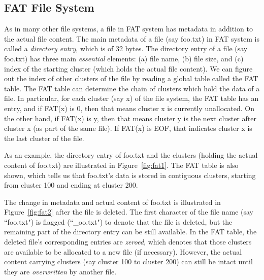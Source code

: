 \subsection{FAT File System}
\begin{paraphrase}
 As in many other file systems, a file in FAT system has metadata in addition to the actual file content. 
The main metadata of a file (say foo.txt) in FAT system is called a \emph{directory entry}, which is of 32 bytes.
The directory entry of a file (say foo.txt) has three main \emph{essential} elements: (a) file name, (b) file size, and 
(c) index of the starting cluster (which holds the actual file content). We can figure 
out the index of other clusters of the file by reading a global table called the FAT table. The FAT table
can determine the chain of clusters which hold the data of a file. In particular, 
for each cluster (say x) of the file system, the FAT table has an entry, and 
if FAT(x) is 0, then that means cluster x is currently unallocated. 
On the other hand, if FAT(x) is y, then that means cluster y is the next cluster after cluster x (as part of the same file).
If FAT(x) is EOF, that indicates cluster x is the last cluster of the file.
   
As an example, the directory entry of foo.txt and the clusters (holding the actual content of foo.txt) 
are illustrated in Figure~\ref{fig:fat1}. The FAT table is also shown, which tells us that foo.txt's data is stored 
in contiguous clusters, starting from cluster 100 and ending at cluster 200.



The change in metadata and actual content of foo.txt is illustrated in Figure~\ref{fig:fat2} after the file is deleted.
The first character of the file name (say ``foo.txt") is flagged (``\_oo.txt") to denote that the file is deleted, 
but the remaining part of the directory entry can be still available. In the FAT table, the deleted file's corresponding
entries are \emph{zeroed}, which denotes that those clusters are available to be allocated to a new file (if necessary).
However, the actual content carrying clusters (say cluster 100 to cluster 200)
can still be intact until they are \emph{overwritten} by another file. 
  

\end{paraphrase}
